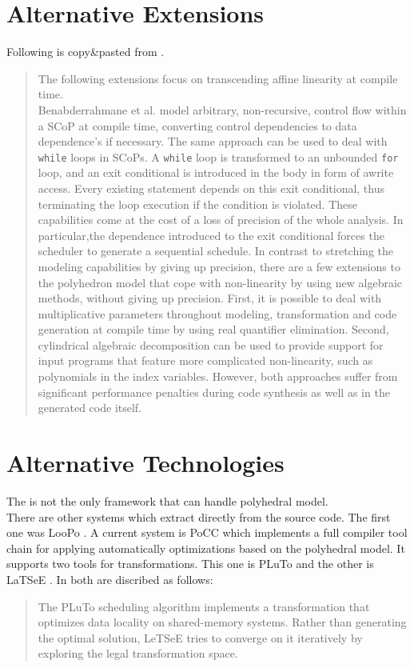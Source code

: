 \section[Alternative Extensions]{Alternative Extensions \cite{PolyhedralEmpiricalStudy}}
Following is copy\&pasted from \cite{PolyhedralEmpiricalStudy}.
\begin{quotation}
The following extensions focus on transcending affine linearity at compile time.\\
Benabderrahmane et al. model arbitrary, non-recursive, control flow within a SCoP at compile time, converting control dependencies to data dependence's if necessary.
The same approach can be used to deal with \texttt{while} loops in SCoPs.
A \texttt{while} loop is transformed to an unbounded \texttt{for} loop, and an exit conditional is introduced in the body in form of awrite access.
Every existing statement depends on this exit conditional, thus terminating the loop execution if the condition is violated.
These capabilities come at the cost of a loss of precision of the whole analysis.
In particular,the dependence introduced to the exit conditional forces the scheduler to generate a sequential schedule.
In contrast to stretching the modeling capabilities by giving up precision, there are a few extensions to the polyhedron model that cope with non-linearity by using new algebraic methods, without giving up precision.
First, it is possible to deal with multiplicative parameters throughout modeling, transformation and code generation at compile time by using real quantifier elimination.
Second, cylindrical algebraic decomposition can be used to provide support for input programs that feature more complicated non-linearity, such as polynomials in the index variables.
However, both approaches suffer from significant performance penalties during code synthesis as well as in the generated code itself.
\end{quotation}

\section[Alternative Technologies]{Alternative Technologies \cite{PolyhedralEmpiricalStudy}}
The \llvm is not the only framework that can handle polyhedral model.\\
There are other systems which extract \scops directly from the source code.
The first one was LooPo \cite{loopo}.
A current system is PoCC \cite{pocc} which implements a full compiler tool chain for applying automatically optimizations based on the polyhedral model.
It supports two tools for transformations.
This one is PLuTo \cite{pluto} and the other is LaTSeE \cite{latsee}.
In \cite{PolyhedralEmpiricalStudy} both are discribed as follows:
\begin{quotation}
    The PLuTo scheduling algorithm implements a transformation that optimizes data locality on shared-memory systems.
    Rather than generating the optimal solution, LeTSeE tries to converge on it iteratively by exploring the legal transformation space.
\end{quotation}
